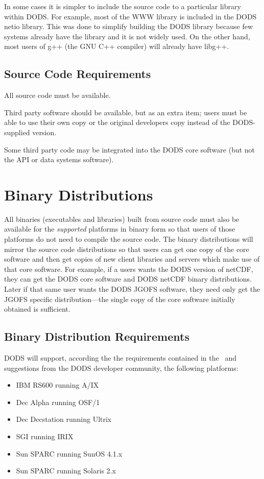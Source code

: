 In some cases it is simpler to include the source code to a particular
library within DODS. For example, most of the WWW library is included
in the DODS netio library. This was done to simplify building the DODS
library because few systems already have the library and it is not
widely used. On the other hand, most users of g++ (the GNU C++
compiler) will already have libg++.

\subsection{Source Code Requirements}

All source code must be available.

Third party software should be available, but as an extra item; users
must be able to use their own copy or the original developers copy
instead of the DODS-supplied version.

Some third party code may be integrated into the DODS core software
(but not the API or data systems software).

\section{Binary Distributions}
\label{binary-dist}

All binaries (executables and libraries) built from source code must also be
available for the {\em supported\/} platforms in binary form so that users of
those platforms do not need to compile the source code. The binary
distributions will mirror the source code distributions so that users can get
one copy of the core software and then get copies of new client libraries and
servers which make use of that core software. For example, if a users wants
the DODS version of netCDF, they can get the DODS core software and DODS
netCDF binary distributions. Later if that same user wants the DODS JGOFS
software, they need only get the JGOFS specific distribution---the single
copy of the core software initially obtained is sufficient.

\subsection{Binary Distribution Requirements}

DODS will support, according the the requirements contained in the \wrkshp\
and suggestions from the DODS developer community, the following platforms:

\begin{itemize}

\item IBM RS600 running A/IX 
\item Dec Alpha running OSF/1
\item Dec Decstation running Ultrix 
\item SGI running IRIX
\item Sun SPARC running SunOS 4.1.x
\item Sun SPARC running Solaris 2.x

\end{itemize}

